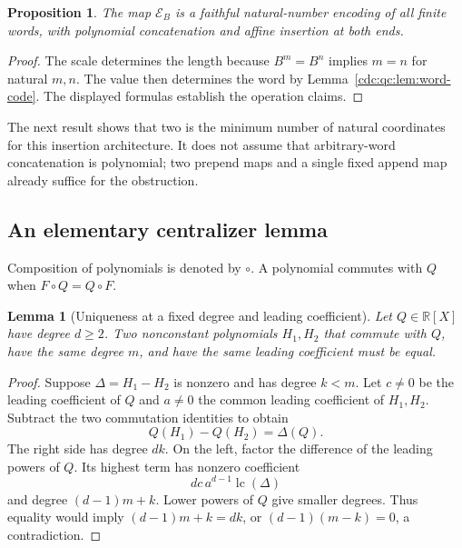 \documentclass[11pt,a4paper]{article}
\newtheorem{lemma}[lemma]{Lemma}
\newtheorem{proposition}[proposition]{Proposition}
\theoremstyle{definition}
\theoremstyle{remark}
\newcommand{\R}{\mathbb R}
\DeclareMathOperator{\lc}{lc}
\begin{document}
\begin{proposition}\label{cdc:qc:prop:two-coordinates}
The map $\mathcal E_B$ is a faithful natural-number encoding of all finite words, with polynomial concatenation and affine insertion at both ends.
\end{proposition}
\begin{proof}
The scale determines the length because $B^m=B^n$ implies $m=n$ for natural $m,n$. The value then determines the word by Lemma~\ref{cdc:qc:lem:word-code}. The displayed formulas establish the operation claims.
\end{proof}
The next result shows that two is the minimum number of natural coordinates for this insertion architecture. It does not assume that arbitrary-word concatenation is polynomial; two prepend maps and a single fixed append map already suffice for the obstruction.

\subsection{An elementary centralizer lemma}
Composition of polynomials is denoted by $\circ$. A polynomial commutes with $Q$ when $F\circ Q=Q\circ F$.

\begin{lemma}[Uniqueness at a fixed degree and leading coefficient]\label{cdc:qc:lem:centralizer-unique}
Let $Q\in\R[X]$ have degree $d\geq2$. Two nonconstant polynomials $H_1,H_2$ that commute with $Q$, have the same degree $m$, and have the same leading coefficient must be equal.
\end{lemma}
\begin{proof}
Suppose $\Delta=H_1-H_2$ is nonzero and has degree $k<m$. Let $c\ne0$ be the leading coefficient of $Q$ and $a\ne0$ the common leading coefficient of $H_1,H_2$. Subtract the two commutation identities to obtain
\[
 Q(H_1)-Q(H_2)=\Delta(Q).
\]
The right side has degree $dk$. On the left, factor the difference of the leading powers of $Q$. Its highest term has nonzero coefficient
\[
 dc\,a^{d-1}\lc(\Delta)
\]
and degree $(d-1)m+k$. Lower powers of $Q$ give smaller degrees. Thus equality would imply $(d-1)m+k=dk$, or $(d-1)(m-k)=0$, a contradiction.
\end{proof}
\end{document}
